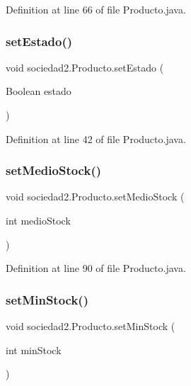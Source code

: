 Definition at line 66 of file Producto.\+java.

\mbox{\label{classsociedad2_1_1_producto_a7f286e1bd9c4e7a16ba71cda04477139}} 
\subsubsection{\texorpdfstring{set\+Estado()}{setEstado()}}
{\footnotesize\ttfamily void sociedad2.\+Producto.\+set\+Estado (\begin{DoxyParamCaption}\item[{Boolean}]{estado }\end{DoxyParamCaption})}



Definition at line 42 of file Producto.\+java.

\mbox{\label{classsociedad2_1_1_producto_ab9a1a3cd64dbd56b3a7fac66a78b8bd8}} 
\subsubsection{\texorpdfstring{set\+Medio\+Stock()}{setMedioStock()}}
{\footnotesize\ttfamily void sociedad2.\+Producto.\+set\+Medio\+Stock (\begin{DoxyParamCaption}\item[{int}]{medio\+Stock }\end{DoxyParamCaption})}



Definition at line 90 of file Producto.\+java.

\mbox{\label{classsociedad2_1_1_producto_a65c75efc7095fce58822d557b3c5905e}} 
\subsubsection{\texorpdfstring{set\+Min\+Stock()}{setMinStock()}}
{\footnotesize\ttfamily void sociedad2.\+Producto.\+set\+Min\+Stock (\begin{DoxyParamCaption}\item[{int}]{min\+Stock }\end{DoxyParamCaption})}



